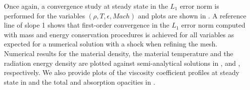 \documentclass[times,doublespace]{fldauth}%
\begin{document}
Once again, a convergence study at steady state in the $L_1$ error norm is performed for the variables $(\rho, T, \epsilon, Mach)$ and plots are shown in  . A reference line of slope 1 shows that first-order convergence in the $L_1$ error norm computed with mass and energy conservation procedures is achieved for all variables as expected for a numerical solution with a shock when refining the mesh. 
Numerical results for the material density, the material temperature and the radiation energy density are plotted against semi-analytical solutions in ,  and , respectively. We also provide plots of the viscosity coefficient profiles at steady state in  and the total and absorption opacities in .
%
\end{document}
